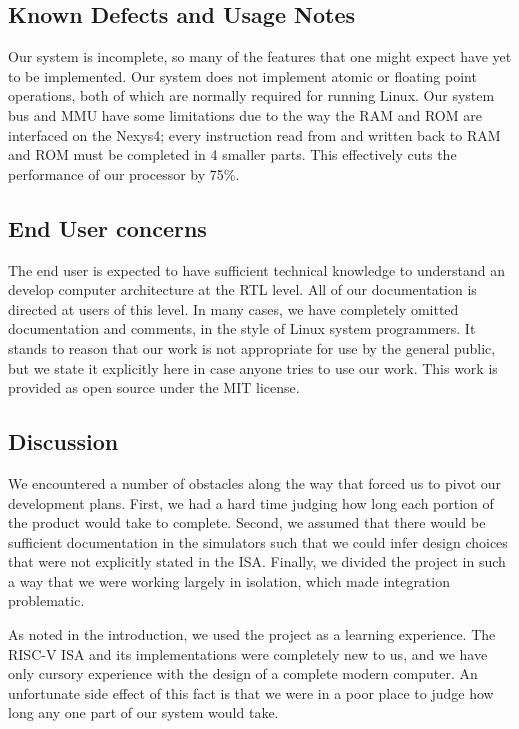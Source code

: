 \documentclass{article}
\begin{document}
\subsection{Known Defects and Usage Notes}
Our system is incomplete, so many of the features that one might expect have yet to be implemented.  Our system does not implement atomic or floating point operations, both of which are normally required for running Linux.  Our system bus and MMU have some limitations due to the way the RAM and ROM are interfaced on the Nexys4; every instruction read from and written back to RAM and ROM must be completed in 4 smaller parts.  This effectively cuts the performance of our processor by 75\%.

\subsection{End User concerns}
The end user is expected to have sufficient technical knowledge to understand an develop computer architecture at the RTL level.  All of our documentation is directed at users of this level.  In many cases, we have completely omitted documentation and comments, in the style of Linux system programmers.  It stands to reason that our work is not appropriate for use by the general public, but we state it explicitly here in case anyone tries to use our work.  This work is provided as open source under the MIT license.

\subsection{Discussion}
We encountered a number of obstacles along the way that forced us to pivot our development plans.  First, we had a hard time judging how long each portion of the product would take to complete.  Second, we assumed that there would be sufficient documentation in the simulators such that we could infer design choices that were not explicitly stated in the ISA.  Finally, we divided the project in such a way that we were working largely in isolation, which made integration problematic.

As noted in the introduction, we used the project as a learning experience.  The RISC-V ISA and its implementations were completely new to us, and we have only cursory experience with the design of a complete modern computer.  An unfortunate side effect of this fact is that we were in a poor place to judge how long any one part of our system would take.  
\end{document}
